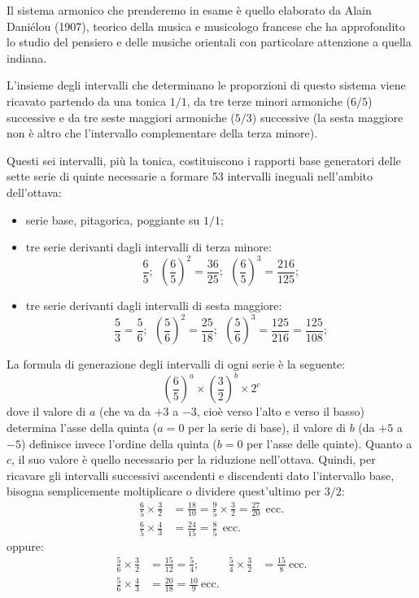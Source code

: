 Il sistema armonico che prenderemo in esame è quello elaborato da Alain
Daniélou (1907), teorico della musica e musicologo francese che ha approfondito
lo studio del pensiero e delle musiche orientali con particolare attenzione a
quella indiana.

L'insieme degli intervalli che determinano le proporzioni di questo sistema
viene ricavato partendo da una tonica $1/1$, da tre terze minori armoniche
($6/5$) successive e da tre seste maggiori armoniche ($5/3$) successive (la
sesta maggiore non è altro che l'intervallo complementare della terza minore).

Questi sei intervalli, più la tonica, costituiscono i rapporti base generatori
delle sette serie di quinte necessarie a formare 53 intervalli ineguali
nell'ambito dell'ottava:
\begin{itemize}
  \item \medskip\noindent serie base, pitagorica, poggiante su $1/1$;
  \item tre serie derivanti dagli intervalli di terza minore:
\[
  \frac{6}{5}; \ \ \left(\frac{6}{5}\right)^{2}=\frac{36}{25}; \ \
  \left(\frac{6}{5}\right)^{3}=\frac{216}{125};
\]
\item tre serie derivanti dagli intervalli di sesta maggiore:
\[
  \frac{5}{3}=\frac{5}{6}; \ \ \left(\frac{5}{6}\right)^{2}=\frac{25}{18}; \ \
  \left(\frac{5}{6}\right)^{3}=\frac{125}{216}=\frac{125}{108};
\]

\end{itemize}

La formula di generazione degli intervalli di ogni serie è la seguente:
\[
  \left(\frac{6}{5}\right)^{a} \times \left(\frac{3}{2}\right)^{b} \times 2^{c}
\]
dove il valore di $a$ (che va da $+3$ a $-3$, cioè verso l'alto e verso il
basso) determina l'asse della quinta ($a = 0$ per la serie di base), il valore
di $b$ (da $+5$ a $-5$) definisce invece l'ordine della quinta ($b = 0$ per
l'asse delle quinte). Quanto a $c$, il suo valore è quello necessario per la
riduzione nell'ottava. Quindi, per ricavare gli intervalli successivi
ascendenti e discendenti dato l'intervallo base, bisogna semplicemente
moltiplicare o dividere quest'ultimo per $3/2$:
\begin{align*}
  \frac{6}{5}\times\frac{3}{2} &= \frac{18}{10} = \frac{9}{5}\times\frac{3}{2}= \frac{27}{20}\ \ \text{ecc.} \\[4pt]
  \frac{6}{5}\times\frac{4}{3} &= \frac{24}{15} = \frac{8}{5}\ \ \text{ecc.}
\end{align*}
oppure:
\begin{align*}
  \frac{5}{6}\times\frac{3}{2} &= \frac{15}{12} = \frac{5}{4}; &
  \frac{5}{4}\times\frac{3}{2} &= \frac{15}{8}\ \text{ecc.} \\[4pt]
  \frac{5}{6}\times\frac{4}{3} &= \frac{20}{18} = \frac{10}{9}\ \text{ecc.}
\end{align*}

